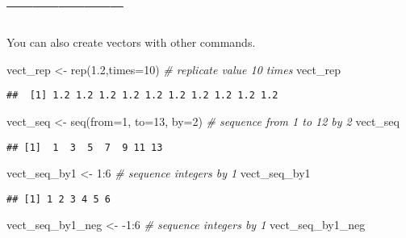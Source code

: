\documentclass[
]{article}
\newenvironment{Shaded}{\begin{snugshade}}{\end{snugshade}}
\newcommand{\AttributeTok}[1]{\textcolor[rgb]{0.77,0.63,0.00}{#1}}
\newcommand{\CommentTok}[1]{\textcolor[rgb]{0.56,0.35,0.01}{\textit{#1}}}
\newcommand{\DecValTok}[1]{\textcolor[rgb]{0.00,0.00,0.81}{#1}}
\newcommand{\FloatTok}[1]{\textcolor[rgb]{0.00,0.00,0.81}{#1}}
\newcommand{\FunctionTok}[1]{\textcolor[rgb]{0.00,0.00,0.00}{#1}}
\newcommand{\NormalTok}[1]{#1}
\newcommand{\OtherTok}[1]{\textcolor[rgb]{0.56,0.35,0.01}{#1}}
\newcommand{\SpecialCharTok}[1]{\textcolor[rgb]{0.00,0.00,0.00}{#1}}
\begin{document}
\hypertarget{section-21}{%
\section{--------------}\label{section-21}}

You can also create vectors with other commands.

\begin{Shaded}
\begin{Highlighting}[]
\NormalTok{vect\_rep }\OtherTok{\textless{}{-}} \FunctionTok{rep}\NormalTok{(}\FloatTok{1.2}\NormalTok{,}\AttributeTok{times=}\DecValTok{10}\NormalTok{) }\CommentTok{\# replicate value 10 times}
\NormalTok{vect\_rep}
\end{Highlighting}
\end{Shaded}

\begin{verbatim}
##  [1] 1.2 1.2 1.2 1.2 1.2 1.2 1.2 1.2 1.2 1.2
\end{verbatim}

\begin{Shaded}
\begin{Highlighting}[]
\NormalTok{vect\_seq }\OtherTok{\textless{}{-}} \FunctionTok{seq}\NormalTok{(}\AttributeTok{from=}\DecValTok{1}\NormalTok{, }\AttributeTok{to=}\DecValTok{13}\NormalTok{, }\AttributeTok{by=}\DecValTok{2}\NormalTok{) }\CommentTok{\# sequence from 1 to 12 by 2}
\NormalTok{vect\_seq}
\end{Highlighting}
\end{Shaded}

\begin{verbatim}
## [1]  1  3  5  7  9 11 13
\end{verbatim}

\begin{Shaded}
\begin{Highlighting}[]
\NormalTok{vect\_seq\_by1 }\OtherTok{\textless{}{-}} \DecValTok{1}\SpecialCharTok{:}\DecValTok{6} \CommentTok{\# sequence integers by 1}
\NormalTok{vect\_seq\_by1}
\end{Highlighting}
\end{Shaded}

\begin{verbatim}
## [1] 1 2 3 4 5 6
\end{verbatim}

\begin{Shaded}
\begin{Highlighting}[]
\NormalTok{vect\_seq\_by1\_neg }\OtherTok{\textless{}{-}} \SpecialCharTok{{-}}\DecValTok{1}\SpecialCharTok{:}\DecValTok{6} \CommentTok{\# sequence integers by 1}
\NormalTok{vect\_seq\_by1\_neg}
\end{Highlighting}
\end{Shaded}
\end{document}
